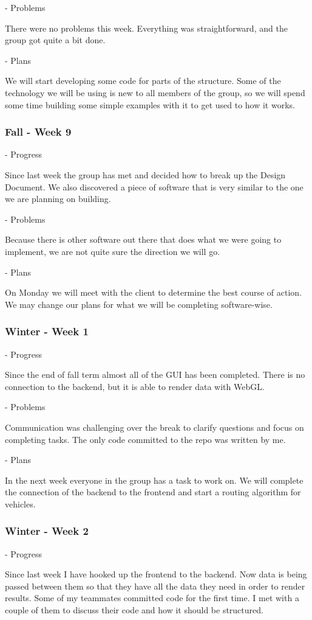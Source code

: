 \documentclass[onecolumn, draftclsnofoot,10pt, compsoc]{IEEEtran}
\begin{document}
- Problems

There were no problems this week.
Everything was straightforward, and the group got quite a bit done.

- Plans

We will start developing some code for parts of the structure.
Some of the technology we will be using is new to all members of the group, so we will spend some time building some simple examples with it to get used to how it works.
\subsubsection{Fall - Week 9}
- Progress

Since last week the group has met and decided how to break up the Design Document.
We also discovered a piece of software that is very similar to the one we are planning on building.

- Problems

Because there is other software out there that does what we were going to implement, we are not quite sure the direction we will go.

- Plans

On Monday we will meet with the client to determine the best course of action.
We may change our plans for what we will be completing software-wise.
\subsubsection{Winter - Week 1}
- Progress

Since the end of fall term almost all of the GUI has been completed.
There is no connection to the backend, but it is able to render data with WebGL.

- Problems

Communication was challenging over the break to clarify questions and focus on completing tasks.
The only code committed to the repo was written by me.

- Plans

In the next week everyone in the group has a task to work on.
We will complete the connection of the backend to the frontend and start a routing algorithm for vehicles.
\subsubsection{Winter - Week 2}
- Progress

Since last week I have hooked up the frontend to the backend.
Now data is being passed between them so that they have all the data they need in order to render results.
Some of my teammates committed code for the first time.
I met with a couple of them to discuss their code and how it should be structured.
\end{document}
